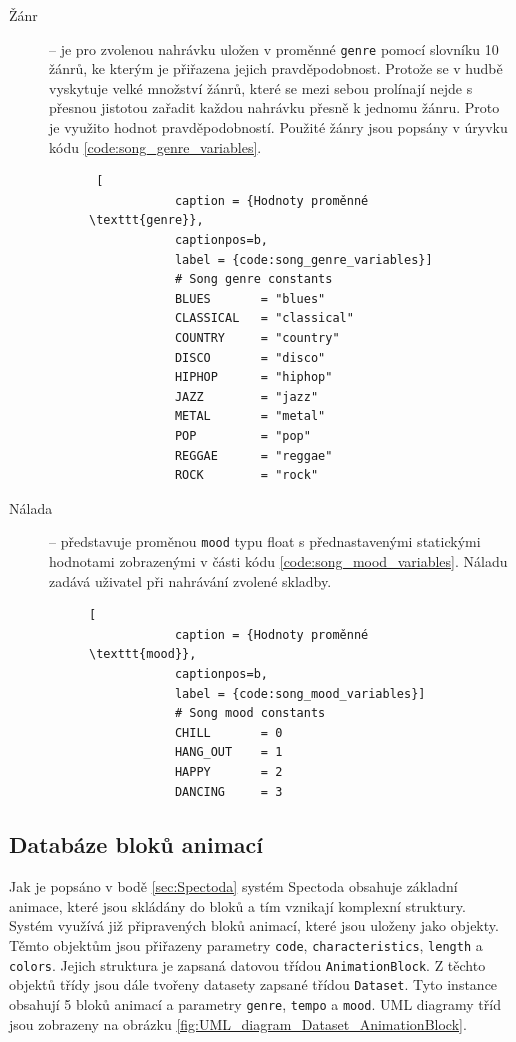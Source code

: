 \begin{description}
    \item[Žánr] -- je pro zvolenou nahrávku uložen v proměnné \texttt{genre} pomocí slovníku 10 žánrů, ke kterým je přiřazena jejich pravděpodobnost. Protože se v hudbě vyskytuje velké množství žánrů, které se mezi sebou prolínají nejde s přesnou jistotou zařadit každou nahrávku přesně k jednomu žánru. Proto je využito hodnot pravděpodobností. Použité žánry jsou popsány v úryvku kódu \ref{code:song_genre_variables}.
    \begin{figure}[H]
        \begin{lstlisting} [
            caption = {Hodnoty proměnné \texttt{genre}},
            captionpos=b,
            label = {code:song_genre_variables}]
            # Song genre constants
            BLUES       = "blues"
            CLASSICAL   = "classical"
            COUNTRY     = "country"
            DISCO       = "disco"
            HIPHOP      = "hiphop"
            JAZZ        = "jazz"
            METAL       = "metal"
            POP         = "pop"
            REGGAE      = "reggae"
            ROCK        = "rock"
        \end{lstlisting}
    \end{figure}

    \item[Nálada] -- představuje proměnou \texttt{mood} typu float s přednastavenými statickými hodnotami zobrazenými v části kódu \ref{code:song_mood_variables}. Náladu zadává uživatel při nahrávání zvolené skladby.  
    \begin{figure}[H]        
        \begin{lstlisting}[
            caption = {Hodnoty proměnné \texttt{mood}},
            captionpos=b,
            label = {code:song_mood_variables}]
            # Song mood constants
            CHILL       = 0
            HANG_OUT    = 1
            HAPPY       = 2
            DANCING     = 3
        \end{lstlisting}
    \end{figure}
    
\end{description}

\subsection{Databáze bloků animací} \label{sec:Database_structure}
Jak je popsáno v bodě \ref{sec:Spectoda} systém Spectoda obsahuje základní animace, které jsou skládány do bloků a tím vznikají komplexní struktury. Systém využívá již připravených bloků animací, které jsou uloženy jako objekty. Těmto objektům jsou přiřazeny parametry \texttt{code}, \texttt{characteristics}, \texttt{length} a \texttt{colors}. Jejich struktura je zapsaná datovou třídou \texttt{AnimationBlock}. Z těchto objektů třídy jsou dále tvořeny datasety zapsané třídou \texttt{Dataset}. Tyto instance obsahují 5 bloků animací a parametry \texttt{genre}, \texttt{tempo} a \texttt{mood}. UML diagramy tříd jsou zobrazeny na obrázku \ref{fig:UML_diagram_Dataset_AnimationBlock}.

